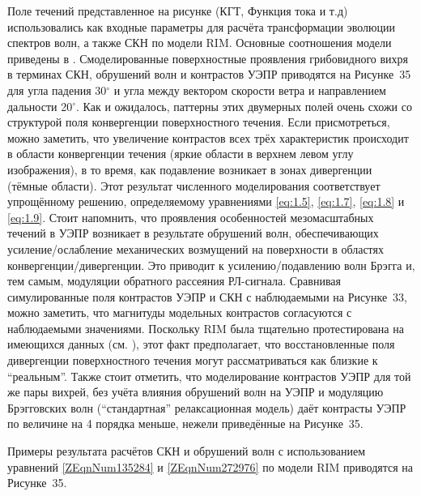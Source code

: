 Поле течений представленное на рисунке (КГТ, Функция тока и т.д) использовались как входные параметры для расчёта трансформации эволюции спектров волн, а также СКН по модели RIM. Основные соотношения модели приведены в . Смоделированные поверхностные проявления грибовидного вихря в терминах СКН, обрушений волн и контрастов УЭПР приводятся на Рисунке~35 для угла падения 30${}^\circ$ и угла между вектором скорости ветра и направлением дальности 20${}^\circ$. Как и ожидалось, паттерны этих двумерных полей очень схожи со структурой поля конвергенции поверхностного течения. Если присмотреться, можно заметить, что увеличение контрастов всех трёх характеристик происходит в области конвергенции течения (яркие области в верхнем левом углу изображения), в то время, как подавление возникает в зонах дивергенции (тёмные области). Этот результат численного моделирования соответствует упрощённому решению, определяемому уравнениями \eqref{eq:1.5}, \eqref{eq:1.7}, \eqref{eq:1.8} и \eqref{eq:1.9}. Стоит напомнить, что проявления особенностей мезомасштабных течений в УЭПР возникает в результате обрушений волн, обеспечивающих усиление/ослабление механических возмущений на поверхности в областях конвергенции/дивергенции. Это приводит к усилению/подавлению волн Брэгга и, тем самым, модуляции обратного рассеяния РЛ-сигнала. Сравнивая симулированные поля контрастов УЭПР и СКН с наблюдаемыми на Рисунке~33, можно заметить, что магнитуды модельных контрастов согласуются с наблюдаемыми значениями. Поскольку RIM была тщательно протестирована на имеющихся данных (см. \citep{Kudryavtsev2005}), этот факт предполагает, что восстановленные поля дивергенции поверхностного течения могут рассматриваться как близкие к ``реальным''. Также стоит отметить, что моделирование контрастов УЭПР для той же пары вихрей, без учёта влияния обрушений волн на УЭПР и модуляцию Брэгговских волн (``стандартная'' релаксационная модель) даёт контрасты УЭПР по величине на 4 порядка меньше, нежели приведённые на Рисунке~35.

Примеры результата расчётов СКН и обрушений волн с использованием уравнений \eqref{ZEqnNum135284} и \eqref{ZEqnNum272976} по модели RIM приводятся на Рисунке~35.

